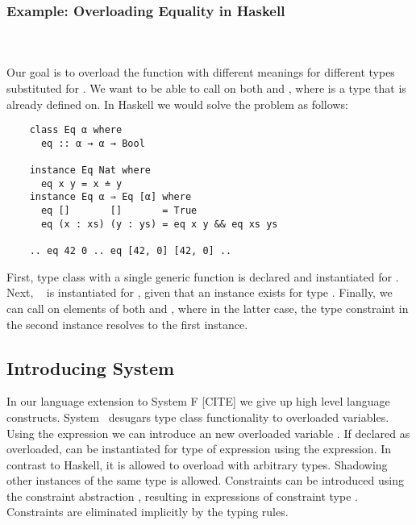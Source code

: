 \subsubsection{Example: Overloading Equality in Haskell}\hfill\\\\
Our goal is to overload the function  with different meanings for different types substituted for .
We want to be able to call  on both  and \inl{[α]}, where  is a type that  is already defined on. 
In Haskell we would solve the problem as follows:
\begin{verbatim}
    class Eq α where
      eq :: α → α → Bool 

    instance Eq Nat where
      eq x y = x ≐ y
    instance Eq α ⇒ Eq [α] where
      eq []       []       = True
      eq (x : xs) (y : ys) = eq x y && eq xs ys 

    .. eq 42 0 .. eq [42, 0] [42, 0] ..
\end{verbatim}
First, type class  with a single generic function  is declared and instantiated for . 
Next, \  is instantiated for \inl{[α]}, given that an instance  exists for type . 
Finally, we can call  on elements of both  and \inl{[Nat]}, where in the latter case, the type constraint  in the second instance resolves to the first instance.

\subsection{Introducing System \Fo}
In our language extension to System F [CITE] we give up high level language constructs. 
System \Fo\ desugars type class functionality to overloaded variables. 
Using the  expression we can introduce an new overloaded variable . 
If declared as overloaded,  can be instantiated for type  of expression  using the  expression.
In contrast to Haskell, it is allowed to overload  with arbitrary types. 
Shadowing other instances of the same type is allowed.
Constraints can be introduced using the constraint abstraction , resulting in expressions of constraint type . 
Constraints are eliminated implicitly by the typing rules.

